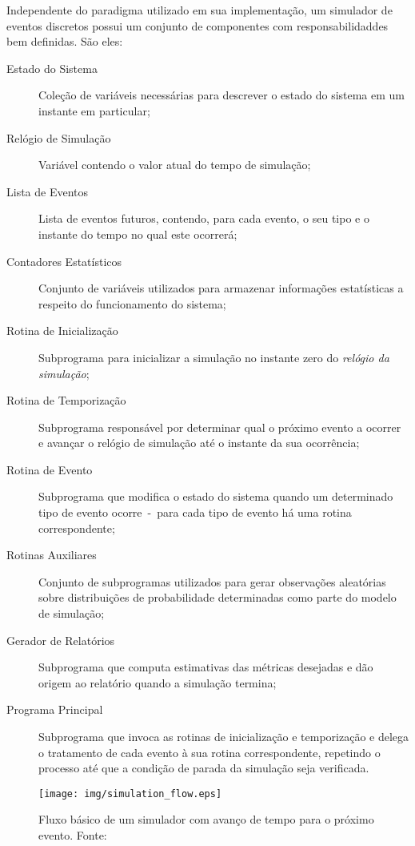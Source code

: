 Independente do paradigma utilizado em sua implementação, um simulador de
eventos discretos possui um conjunto de componentes com responsabilidaddes bem
definidas. São eles:

\begin{description}
\item[Estado do Sistema] Coleção de variáveis necessárias para descrever o estado do sistema em um instante em particular;
\item[Relógio de Simulação] Variável contendo o valor atual do tempo de simulação;
\item[Lista de Eventos] Lista de eventos futuros, contendo, para cada evento, o
seu tipo e o instante do tempo no qual este ocorrerá;
\item[Contadores Estatísticos] Conjunto de variáveis utilizados para armazenar informações estatísticas a respeito do funcionamento do sistema;
\item[Rotina de Inicialização] Subprograma para inicializar a simulação no
instante zero do \textit{relógio da simulação};
\item[Rotina de Temporização] Subprograma responsável por determinar qual o
próximo evento a ocorrer e avançar o relógio de simulação até o instante da sua
ocorrência;
\item[Rotina de Evento] Subprograma que modifica o estado do sistema quando um determinado tipo de evento ocorre~-~para cada tipo de evento há uma rotina
correspondente;
\item[Rotinas Auxiliares] Conjunto de subprogramas utilizados para gerar observações aleatórias sobre distribuições de probabilidade determinadas como parte do modelo de simulação;
\item[Gerador de Relatórios] Subprograma que computa estimativas das métricas desejadas e dão origem ao relatório quando a simulação termina;
\item[Programa Principal] Subprograma que invoca as rotinas de inicialização e temporização e delega o tratamento de cada evento à sua rotina correspondente, repetindo o processo até que a condição de parada da simulação seja verificada.
\end{description}

\begin{figure}[htb!]
\centering\texttt{[image: img/simulation\_flow.eps]}
\caption[Fluxo de execução de um simulador]{\label{fig:simflow}Fluxo básico de um simulador com avanço de tempo para o próximo evento. Fonte:~\cite{Law}}
\end{figure}

